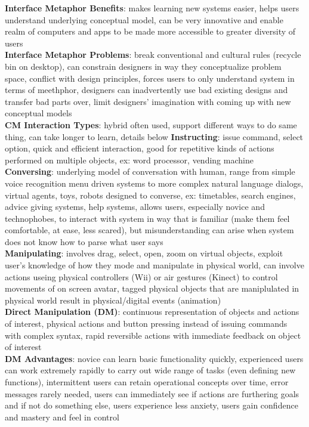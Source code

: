 \documentclass[a4paper]{article}
\begin{document}
\begin{multicols}{2}
        \textbf{Interface Metaphor Benefits}: makes learning new systems easier, helps users understand underlying conceptual model, can be very innovative and enable realm of computers and apps to be made more accessible to greater diversity of users\\
        \textbf{Interface Metaphor Problems}: break conventional and cultural rules (recycle bin on desktop), can constrain designers in way they conceptualize problem space, conflict with design principles, forces users to only understand system in terms of meethphor, designers can inadvertently use bad existing designs and transfer bad parts over, limit designers' imagination with coming up with new conceptual models\\
        \textbf{CM Interaction Types}: hybrid often used, support different ways to do same thing, can take longer to learn, details below
        \textbf{Instructing}: issue command, select option, quick and efficient interaction, good for repetitive kinds of actions performed on multiple objects, ex: word processor, vending machine\\
        \textbf{Conversing}: underlying model of conversation with human, range from simple voice recognition menu driven systems to more complex natural language dialogs, virtual agents, toys, robots designed to converse, ex: timetables, search engines, advice giving systems, help systems, allows users, especially novice and technophobes, to interact with system in way that is familiar (make them feel comfortable, at ease, less scared), but misunderstanding can arise when system does not know how to parse what user says\\
        \textbf{Manipulating}: involves drag, select, open, zoom on virtual objects, exploit user's knowledge of how they mode and manipulate in physical world, can involve actions useing physical controllers (Wii) or air gestures (Kinect) to control movements of on screen avatar, tagged physical objects that are maniplulated in physical world result in physical/digital events (animation)\\
        \textbf{Direct Manipulation (DM)}: continuous representation of objects and actions of interest, physical actions and button pressing instead of issuing commands with complex syntax, rapid reversible actions with immediate feedback on object of interest\\
        \textbf{DM Advantages}: novice can learn basic functionality quickly, experienced users can work extremely rapidly to carry out wide range of tasks (even defining new functions), intermittent users can retain operational concepts over time, error messages rarely needed, users can immediately see if actions are furthering goals and if not do something else, users experience less anxiety, users gain confidence and mastery and feel in control\\

\end{multicols}
\end{document}
